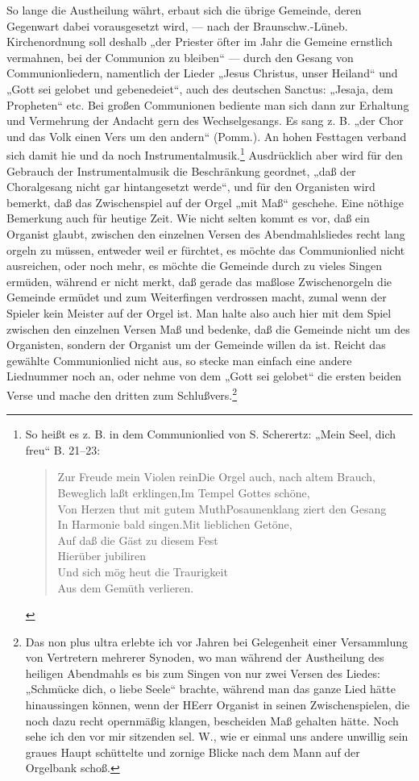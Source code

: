 So lange die Austheilung währt, erbaut sich die übrige Gemeinde, deren Gegenwart dabei vorausgesetzt wird, — nach der Braunschw.-Lüneb. Kirchenordnung soll deshalb „der Priester öfter im Jahr die Gemeine ernstlich vermahnen, bei der Communion zu bleiben“ — durch den Gesang von Communionliedern, namentlich der Lieder „Jesus Christus, unser Heiland“ und „Gott sei gelobet und gebenedeiet“, auch des deutschen Sanctus: „Jesaja, dem Propheten“ etc. Bei großen Communionen bediente man sich dann zur Erhaltung und Vermehrung der Andacht gern des Wechselgesangs. Es sang z. B. „der Chor und das Volk einen Vers um den andern“ (Pomm.). An hohen Festtagen verband sich damit hie und da noch Instrumentalmusik.\footnote{So heißt es z. B. in dem Communionlied von S. Scherertz: „Mein Seel, dich freu“ B. 21–23:
\begin{verse}
Zur Freude mein Violen rein\quad Die Orgel auch, nach altem Brauch,\\
Beweglich laßt erklingen,\quad Im Tempel Gottes schöne,\\
Von Herzen thut mit gutem Muth\quad Posaunenklang ziert den Gesang\\
In Harmonie bald singen.\quad Mit lieblichen Getöne,\\[1ex]
Auf daß die Gäst zu diesem Fest\\
Hierüber jubiliren\\
Und sich mög heut die Traurigkeit\\
Aus dem Gemüth verlieren.
\end{verse}} Ausdrücklich aber wird für den Gebrauch der Instrumentalmusik die Beschränkung geordnet, „daß der Choralgesang nicht gar hintangesetzt werde“, und für den
Organisten wird bemerkt, daß das Zwischenspiel auf der Orgel „mit Maß“ geschehe. Eine nöthige Bemerkung auch für heutige Zeit. Wie nicht selten kommt es vor, daß ein Organist glaubt, zwischen den einzelnen Versen des Abendmahlsliedes recht lang orgeln zu müssen, entweder weil er fürchtet, es möchte das Communionlied nicht ausreichen, oder noch mehr, es möchte die Gemeinde durch zu vieles Singen ermüden, während er nicht merkt, daß gerade das maßlose Zwischenorgeln die Gemeinde ermüdet und zum Weiterfingen verdrossen macht, zumal wenn der Spieler kein Meister auf der Orgel ist. Man halte also auch hier mit dem Spiel zwischen den einzelnen Versen Maß und bedenke, daß die Gemeinde nicht um des Organisten, sondern der Organist um der Gemeinde willen da ist. Reicht das gewählte Communionlied nicht aus, so stecke man einfach eine andere Liednummer noch an, oder nehme von dem „Gott sei gelobet“ die ersten beiden Verse und mache den dritten zum Schlußvers.\footnote{Das non plus ultra erlebte ich vor Jahren bei Gelegenheit einer Versammlung von Vertretern mehrerer Synoden, wo man während der Austheilung des heiligen Abendmahls es bis zum Singen von nur zwei Versen des Liedes: „Schmücke dich, o liebe Seele“ brachte, während man das ganze Lied hätte hinaussingen können, wenn der HEerr Organist in seinen Zwischenspielen, die noch dazu recht opernmäßig klangen, bescheiden Maß gehalten hätte. Noch sehe ich den vor mir sitzenden sel. W., wie er einmal uns andere unwillig sein graues Haupt schüttelte und zornige Blicke nach dem Mann auf der Orgelbank schoß.}

